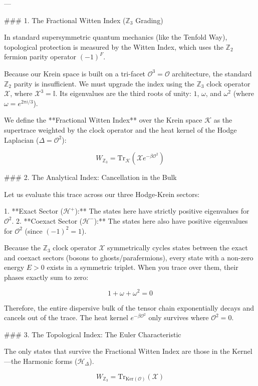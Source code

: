 ---

### 1. The Fractional Witten Index ($\mathbb{Z}_3$ Grading)

In standard supersymmetric quantum mechanics (like the Tenfold Way), topological protection is measured by the Witten Index, which uses the $\mathbb{Z}_2$ fermion parity operator $(-1)^F$.

Because our Krein space is built on a tri-facet $\mathcal{O}^3 = \mathcal{O}$ architecture, the standard $\mathbb{Z}_2$ parity is insufficient. We must upgrade the index using the $\mathbb{Z}_3$ clock operator $\mathcal{X}$, where $\mathcal{X}^3 = \mathbb{I}$. Its eigenvalues are the third roots of unity: $1$, $\omega$, and $\omega^2$ (where $\omega = e^{2\pi i/3}$).

We define the **Fractional Witten Index** over the Krein space $\mathcal{K}$ as the supertrace weighted by the clock operator and the heat kernel of the Hodge Laplacian ($\Delta = \mathcal{O}^2$):


$$W_{\mathbb{Z}_3} = \text{Tr}_{\mathcal{K}}(\mathcal{X} e^{-\beta \mathcal{O}^2})$$

### 2. The Analytical Index: Cancellation in the Bulk

Let us evaluate this trace across our three Hodge-Krein sectors:

1. **Exact Sector ($\mathcal{H}^+$):** The states here have strictly positive eigenvalues for $\mathcal{O}^2$.
2. **Coexact Sector ($\mathcal{H}^-$):** The states here also have positive eigenvalues for $\mathcal{O}^2$ (since $(-1)^2 = 1$).

Because the $\mathbb{Z}_3$ clock operator $\mathcal{X}$ symmetrically cycles states between the exact and coexact sectors (bosons to ghosts/parafermions), every state with a non-zero energy $E > 0$ exists in a symmetric triplet. When you trace over them, their phases exactly sum to zero:


$$1 + \omega + \omega^2 = 0$$

Therefore, the entire dispersive bulk of the tensor chain exponentially decays and cancels out of the trace. The heat kernel $e^{-\beta \mathcal{O}^2}$ only survives where $\mathcal{O}^2 = 0$.

### 3. The Topological Index: The Euler Characteristic

The only states that survive the Fractional Witten Index are those in the Kernel—the Harmonic forms ($\mathcal{H}_\Delta$).


$$W_{\mathbb{Z}_3} = \text{Tr}_{\text{Ker}(\mathcal{O})}(\mathcal{X})$$

